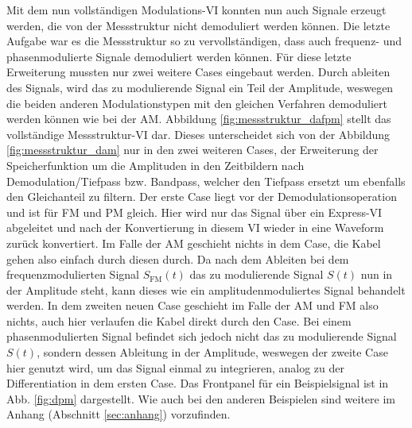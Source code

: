 	\pagestyle{headings}
	Mit dem nun vollständigen Modulations-VI konnten nun auch Signale erzeugt werden, die von der Messstruktur nicht demoduliert werden können.
	Die letzte Aufgabe war es die Messstruktur so zu vervollständigen, dass auch frequenz- und phasenmodulierte Signale demoduliert werden können.
	Für diese letzte Erweiterung mussten nur zwei weitere Cases eingebaut werden.
	Durch ableiten des Signals, wird das zu modulierende Signal ein Teil der Amplitude, weswegen die beiden anderen Modulationstypen mit den gleichen Verfahren demoduliert werden können wie bei der AM.
	Abbildung \ref{fig:messstruktur_dafpm} stellt das vollständige Messstruktur-VI dar.
	Dieses unterscheidet sich von der Abbildung \ref{fig:messstruktur_dam} nur in den zwei weiteren Cases, der Erweiterung der Speicherfunktion um die Amplituden in den Zeitbildern nach Demodulation/Tiefpass bzw. Bandpass, welcher den Tiefpass ersetzt um ebenfalls den Gleichanteil zu filtern.
	Der erste Case liegt vor der Demodulationsoperation und ist für FM und PM gleich.
	Hier wird nur das Signal über ein Express-VI abgeleitet und nach der Konvertierung in diesem VI wieder in eine Waveform zurück konvertiert.
	Im Falle der AM geschieht nichts in dem Case, die Kabel gehen also einfach durch diesen durch.
	Da nach dem Ableiten bei dem frequenzmodulierten Signal $S_\text{FM}(t)$ das zu modulierende Signal $S(t)$ nun in der Amplitude steht, kann dieses wie ein amplitudenmoduliertes Signal behandelt werden.
	In dem zweiten neuen Case geschieht im Falle der AM und FM also nichts, auch hier verlaufen die Kabel direkt durch den Case.
	Bei einem phasenmodulierten Signal befindet sich jedoch nicht das zu modulierende Signal $S(t)$, sondern dessen Ableitung in der Amplitude, weswegen der zweite Case hier genutzt wird, um das Signal einmal zu integrieren, analog zu der Differentiation in dem ersten Case.
	Das Frontpanel für ein Beispielsignal ist in Abb. \ref{fig:dpm} dargestellt. 
	Wie auch bei den anderen Beispielen sind weitere im Anhang (Abschnitt \ref{sec:anhang}) vorzufinden.
	
